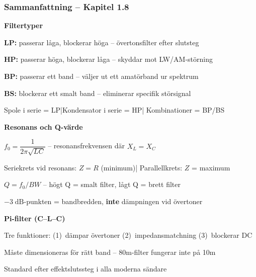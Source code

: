 \documentclass[a4paper,11pt,twoside]{book}
\newcommand{\emoji}[1]{{\emojifont #1}}
\begin{document}
\subsubsection*{Sammanfattning -- Kapitel 1.8}

\begin{orangebox}[title={\emoji{🎯} Viktigt för provet -- Kapitel 1.8}]

\textbf{Filtertyper}
\begin{checklist}
  \item \textbf{LP:} passerar låga, blockerar höga -- övertonsfilter efter slutsteg
  \item \textbf{HP:} passerar höga, blockerar låga -- skyddar mot LW/AM-störning
  \item \textbf{BP:} passerar ett band -- väljer ut ett amatörband ur spektrum
  \item \textbf{BS:} blockerar ett smalt band -- eliminerar specifik störsignal
  \item Spole i serie = LP\quad|\quad Kondensator i serie = HP\quad|\quad
        Kombinationer = BP/BS
\end{checklist}

\textbf{Resonans och Q-värde}
\begin{checklist}
  \item $f_0 = \dfrac{1}{2\pi\sqrt{LC}}$ \quad -- resonansfrekvensen där $X_L = X_C$
  \item Seriekrets vid resonans: $Z = R$ (minimum)\quad|\quad
        Parallellkrets: $Z$ = maximum
  \item $Q = f_0/BW$ \quad -- högt Q = smalt filter, lågt Q = brett filter
  \item $-3\;\text{dB}$-punkten = bandbredden, \textbf{inte} dämpningen vid övertoner
\end{checklist}

\textbf{Pi-filter (C--L--C)}
\begin{checklist}
  \item Tre funktioner: (1)~dämpar övertoner \quad
                        (2)~impedansmatchning \quad
                        (3)~blockerar DC
  \item Måste dimensioneras för rätt band -- 80m-filter fungerar inte på 10m
  \item Standard efter effektslutssteg i alla moderna sändare
\end{checklist}

\end{orangebox}
\end{document}

